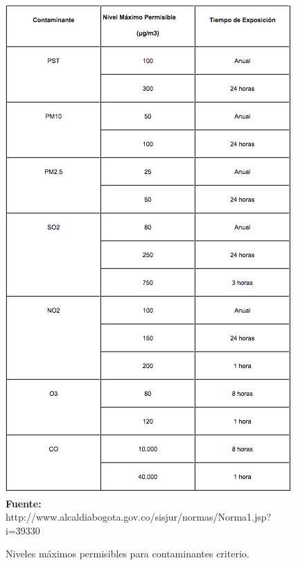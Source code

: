 \documentclass[a4paper,openright,12pt]{book}
\theoremstyle{definition}
\theoremstyle{remark}
\begin{document}
\begin{figure}[h]
\centering
\caption{Niveles máximos permisibles para contaminantes criterio.} 
\includegraphics[scale=0.52]{Norma1}
\\\textbf{Fuente:} http://www.alcaldiabogota.gov.co/sisjur/normas/Norma1.jsp?i=39330
\label{fig:Ubicacion}
\end{figure}
\end{document}
